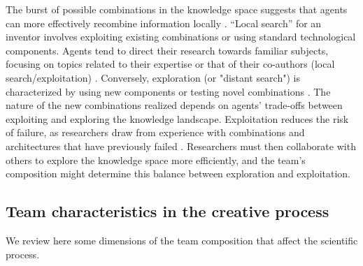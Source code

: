          The burst of possible combinations in the knowledge space suggests that agents can more effectively recombine information locally \citep{fleming2001recombinant}. ``Local search'' for an inventor involves exploiting existing combinations or using standard technological components. Agents tend to direct their research towards familiar subjects, focusing on topics related to their expertise or that of their co-authors (local search/exploitation) \citep{fleming2001recombinant,nelson1985evolutionary,march1991exploration}. Conversely, exploration (or "distant search") is characterized by using new components or testing novel combinations \citep{fleming2001recombinant,march1991exploration}. The nature of the new combinations realized depends on agents' trade-offs between exploiting and exploring the knowledge landscape. Exploitation reduces the risk of failure, as researchers draw from experience with combinations and architectures that have previously failed \citep{vincenti1990engineers}. Researchers must then collaborate with others to explore the knowledge space more efficiently, and the team's composition might determine this balance between exploration and exploitation.
        
 \subsection{Team characteristics in the creative process}
        We review here some dimensions of the team composition that affect the scientific process.
        
